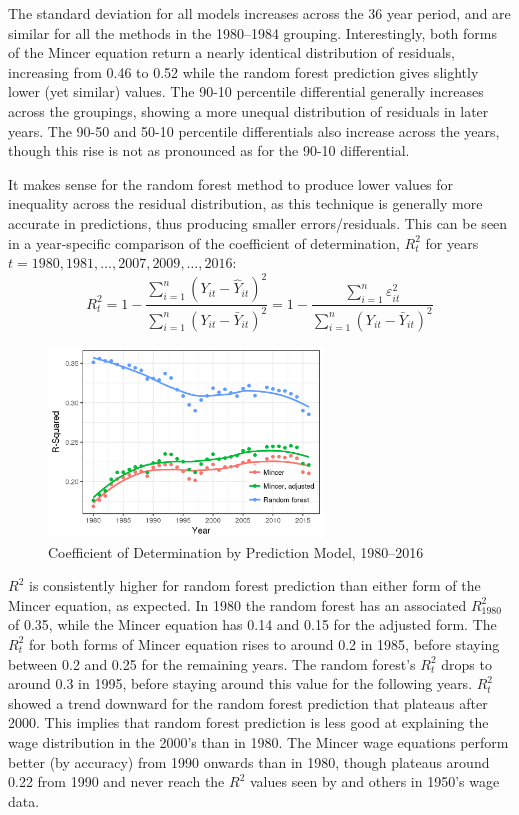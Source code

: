 \documentclass[notitlepage,12pt]{article}
\begin{document}
The standard deviation for all models increases across the 36 year period, and are similar for all the methods in the 1980--1984 grouping.  Interestingly, both forms of the Mincer equation return a nearly identical distribution of residuals, increasing from 0.46 to 0.52 while the random forest prediction gives slightly lower (yet similar) values.  The 90-10 percentile differential generally increases across the groupings, showing a more unequal distribution  of residuals in later years.  The 90-50 and 50-10 percentile differentials also increase across the years, though this rise is not as pronounced as for the 90-10 differential.  

It makes sense for the random forest method to produce lower values for inequality across the residual distribution, as this technique is generally more accurate in predictions, thus producing smaller errors/residuals.  This can be seen in a year-specific comparison of the coefficient of determination, $R_t^2$ for years $t=1980, 1981, \dots , 2007, 2009, \dots , 2016$:
\begin{equation}
R^2_t = 1 - \frac{\sum_{i=1}^n(Y_{it} -  \hat{Y}_{it})^2}{\sum_{i=1}^n (Y_{it} - \bar{Y}_{it})^2} = 1 - \frac{\sum_{i=1}^n\varepsilon_{it}^2}{\sum_{i=1}^n (Y_{it} - \bar{Y}_{it})^2}
\end{equation}

\begin{figure}[h]
  \caption{Coefficient of Determination by Prediction Model, 1980--2016}
  \centering
  \includegraphics[width=0.65\textwidth]{rsquared.png}
\end{figure}
\noindent
$R^2$ is consistently higher for random forest prediction than either form of the Mincer equation, as expected.  In 1980 the random forest has an associated $R_{1980}^2$ of 0.35, while the Mincer equation has 0.14 and 0.15 for the adjusted form.  The $R_t^2$ for both forms of Mincer equation rises to around 0.2 in 1985, before staying between 0.2 and 0.25 for the remaining years.  The random forest's $R^2_t$ drops to around 0.3 in 1995, before staying around this value for the following years.  $R^2_t$ showed a trend downward for the random forest prediction that plateaus after 2000.  This implies that random forest prediction is less good at explaining the wage distribution in the 2000's than in 1980.  The Mincer wage equations perform better (by accuracy) from 1990 onwards than in 1980, though plateaus around 0.22 from 1990 and never reach the $R^2$ values seen by \cite{mincer1958investment} and others in 1950's wage data.
\end{document}
